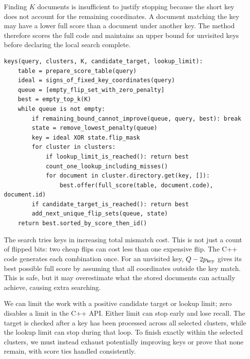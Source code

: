 Finding $K$ documents is insufficient to justify stopping because the short key does not
account for the remaining coordinates. A document matching the key may have a lower full
score than a document under another key. The method therefore scores the full code and
maintains an upper bound for unvisited keys before declaring the local search complete.

\begin{lstlisting}[caption={Weighted key lookup. Generate the key sequence once; charge every cluster lookup.}]
keys(query, clusters, K, candidate_target, lookup_limit):
    table = prepare_score_table(query)
    ideal = signs_of_fixed_key_coordinates(query)
    queue = [empty_flip_set_with_zero_penalty]
    best = empty_top_k(K)
    while queue is not empty:
        if remaining_bound_cannot_improve(queue, query, best): break
        state = remove_lowest_penalty(queue)
        key = ideal XOR state.flip_mask
        for cluster in clusters:
            if lookup_limit_is_reached(): return best
            count_one_lookup_including_misses()
            for document in cluster.directory.get(key, []):
                best.offer(full_score(table, document.code), document.id)
        if candidate_target_is_reached(): return best
        add_next_unique_flip_sets(queue, state)
    return best.sorted_by_score_then_id()
\end{lstlisting}

The search tries keys in increasing total mismatch cost. This is not just a count of flipped
bits: two cheap flips can cost less than one expensive flip. The C++ code generates each
combination once. For an unvisited key, $Q-2p_{\rm key}$ gives its best possible full score
by assuming that all coordinates outside the key match. This is safe, but it may overestimate
what the stored documents can actually achieve, causing extra searching.

We can limit the work with a positive candidate target or lookup limit; zero disables a limit
in the C++ API. Either limit can stop early and lose recall. The target is checked after a
key has been processed across all selected clusters, while the lookup limit can stop during
that loop. To finish exactly within the selected clusters, we must instead exhaust potentially
improving keys or prove that none remain, with score ties handled consistently.

